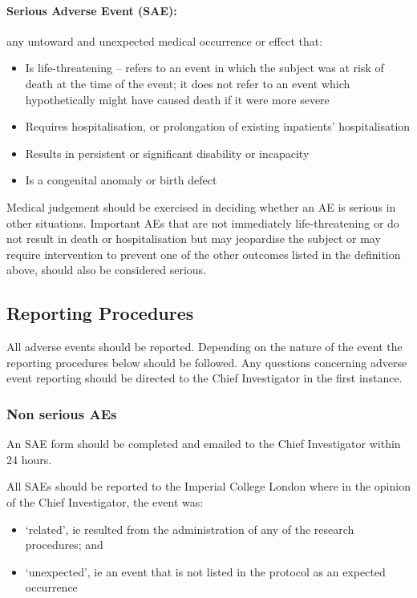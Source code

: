 \documentclass[a4paper,10pt]{article}
\begin{document}
\paragraph{Serious Adverse Event (SAE):}any untoward and unexpected medical occurrence or effect that: \begin{itemize}
	\item Is life-threatening – refers to an event in which the subject was at risk of death at the time of the event; it does not refer to an event which hypothetically might have caused death if it were more severe
	\item Requires hospitalisation, or prolongation of existing inpatients’ hospitalisation
    \item Results in persistent or significant disability or incapacity
	\item Is a congenital anomaly or birth defect
                                                                                              \end{itemize}

Medical judgement should be exercised in deciding whether an AE is serious in other situations. Important AEs that are not immediately life-threatening or do not result in death or hospitalisation but may jeopardise the subject or may require intervention to prevent one of the other outcomes listed in the definition above, should also be considered serious.

\subsection{Reporting Procedures}
All adverse events should be reported. Depending on the nature of the event the reporting procedures below should be followed. Any questions concerning adverse event reporting should be directed to the Chief Investigator in the first instance.  

\subsubsection{Non serious AEs}
An SAE form should be completed and emailed to the Chief Investigator within 24 hours. 

All SAEs should be reported to the Imperial College London where in the opinion of the Chief Investigator, the event was: \begin{itemize}
                                                                                                                           \item ‘related’, ie resulted from the administration of any of the research procedures; and
					   \item ‘unexpected’, ie an event that is not listed in the protocol as an expected occurrence
                                                                                                                         \end{itemize}
\end{document}
